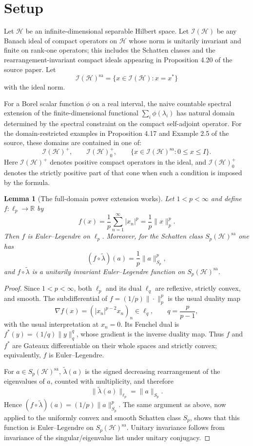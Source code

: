 \documentclass[11pt]{article}
\newtheorem{lemma}{Lemma}
\newcommand{\HH}{\mathcal H}
\newcommand{\I}{\mathcal I}
\newcommand{\sa}{\mathrm{sa}}
\begin{document}
\section*{Setup}

Let $\HH$ be an infinite-dimensional separable Hilbert space. Let
$\I(\HH)$ be any Banach ideal of compact operators on $\HH$ whose norm is
unitarily invariant and finite on rank-one operators; this includes the
Schatten classes and the rearrangement-invariant compact ideals appearing
in Proposition 4.20 of the source paper. Let
\[
  \I(\HH)^\sa=\{x\in\I(\HH):x=x^*\}
\]
with the ideal norm.

For a Borel scalar function $\phi$ on a real interval, the naive
countable spectral extension of the finite-dimensional functional
$\sum_i \phi(\lambda_i)$ has natural domain determined by the spectral
constraint on the compact self-adjoint operator. For the domain-restricted
examples in Proposition 4.17 and Example 2.5 of the source, these domains
are contained in one of:
\[
  \I(\HH)^+,\qquad
  \I(\HH)^+_0,\qquad
  \{x\in\I(\HH)^\sa:0\le x\le I\}.
\]
Here $\I(\HH)^+$ denotes positive compact operators in the ideal, and
$\I(\HH)^+_0$ denotes the strictly positive part of that cone when such a
condition is imposed by the formula.

\begin{lemma}[The full-domain power extension works]
Let $1<p<\infty$ and define $f:\ell_p\to\mathbb R$ by
\[
  f(x)=\frac1p\sum_{n=1}^\infty |x_n|^p=\frac1p\|x\|_p^p.
\]
Then $f$ is Euler--Legendre on $\ell_p$. Moreover, for the Schatten class
$S_p(\HH)^\sa$ one has
\[
  (f\circ\widetilde\lambda)(a)=\frac1p\|a\|_{S_p}^p,
\]
and $f\circ\widetilde\lambda$ is a unitarily invariant Euler--Legendre
function on $S_p(\HH)^\sa$.
\end{lemma}

\begin{proof}
Since $1<p<\infty$, both $\ell_p$ and its dual $\ell_q$ are reflexive,
strictly convex, and smooth. The subdifferential of
$f=(1/p)\|\cdot\|_p^p$ is the usual duality map
\[
  \nabla f(x)=(|x_n|^{p-2}x_n)_n\in\ell_q,
  \qquad q=\frac{p}{p-1},
\]
with the usual interpretation at $x_n=0$. Its Fenchel dual is
$f^*(y)=(1/q)\|y\|_q^q$, whose gradient is the inverse duality map.
Thus $f$ and $f^*$ are Gateaux differentiable on their whole spaces and
strictly convex; equivalently, $f$ is Euler--Legendre.

For $a\in S_p(\HH)^\sa$, $\widetilde\lambda(a)$ is the signed decreasing
rearrangement of the eigenvalues of $a$, counted with multiplicity, and
therefore
\[
  \|\widetilde\lambda(a)\|_{\ell_p}=\|a\|_{S_p}.
\]
Hence $(f\circ\widetilde\lambda)(a)=(1/p)\|a\|_{S_p}^p$. The same
argument as above, now applied to the uniformly convex and smooth
Schatten class $S_p$, shows that this function is Euler--Legendre on
$S_p(\HH)^\sa$. Unitary invariance follows from invariance of the
singular/eigenvalue list under unitary conjugacy.
\end{proof}
\end{document}
